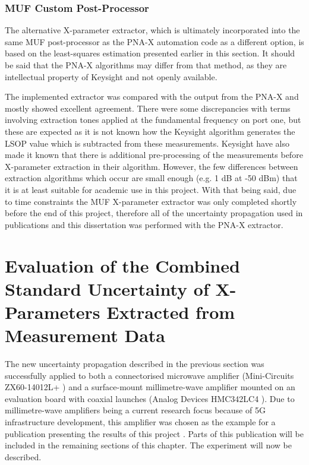 \documentclass[../thesis/thesis.tex]{subfiles}
\begin{document}
\subsubsection{MUF Custom Post-Processor}

The alternative X-parameter extractor, which is ultimately incorporated into the same MUF post-processor as the PNA-X automation code as a different option, is based on the least-squares estimation presented earlier in this section. It should be said that the PNA-X algorithms may differ from that method, as they are intellectual property of Keysight and not openly available.

The implemented extractor was compared with the output from the PNA-X and mostly showed excellent agreement. There were some discrepancies with terms involving extraction tones applied at the fundamental frequency on port one, but these are expected as it is not known how the Keysight algorithm generates the LSOP value which is subtracted from these measurements. Keysight have also made it known that there is additional pre-processing of the measurements before X-parameter extraction in their algorithm. However, the few differences between extraction algorithms which occur are small enough (e.g. 1 dB at -50 dBm) that it is at least suitable for academic use in this project. With that being said, due to time constraints the MUF X-parameter extractor was only completed shortly before the end of this project, therefore all of the uncertainty propagation used in publications and this dissertation was performed with the PNA-X extractor.

\section{Evaluation of the Combined Standard Uncertainty of X-Parameters Extracted from Measurement Data}

The new uncertainty propagation described in the previous section was successfully applied to both a connectorised microwave amplifier (Mini-Circuits ZX60-14012L+ \cite{minicircuits}) and a surface-mount millimetre-wave amplifier mounted on an evaluation board with coaxial launches (Analog Devices HMC342LC4 \cite{hittite_amp}). Due to millimetre-wave amplifiers being a current research focus because of 5G infrastructure development, this amplifier was chosen as the example for a publication presenting the results of this project \cite{Stant_2018_TMTT}. Parts of this publication will be included in the remaining sections of this chapter. The experiment will now be described.
\end{document}
